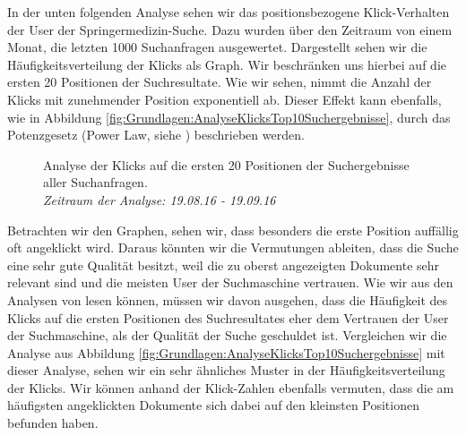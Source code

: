 
In der unten folgenden Analyse sehen wir das positionsbezogene Klick-Verhalten der User der Springermedizin-Suche. Dazu wurden über den Zeitraum von einem Monat, die letzten 1000 Suchanfragen ausgewertet. Dargestellt sehen wir die Häufigkeitsverteilung der Klicks als Graph. Wir beschränken uns hierbei auf die ersten 20 Positionen der Suchresultate. Wie wir sehen, nimmt die Anzahl der Klicks mit zunehmender Position exponentiell ab. Dieser Effekt kann ebenfalls, wie in Abbildung \ref{fig:Grundlagen:AnalyseKlicksTop10Suchergebnisse}, durch das Potenzgesetz (Power Law, siehe \cite{PowerLaw}) beschrieben werden. 

\begin{figure}[H]
\centering 
\vspace{-1em}
\caption[Analyse der Klicks auf die ersten 20 Positionen der Suchergebnisse aller Suchanfragen. \textit{Zeitraum der Analyse: 19.08.16 - 19.09.16}]{Analyse der Klicks auf die ersten 20 Positionen der Suchergebnisse aller Suchanfragen. \\ \textit{Zeitraum der Analyse: 19.08.16 - 19.09.16}}
\label{fig:Grundlage:AnalyseKlicksPositionen}

\topRanks
  

\vspace{-2em}
\end{figure}

Betrachten wir den Graphen, sehen wir, dass besonders die erste Position auffällig oft angeklickt wird. Daraus könnten wir die Vermutungen ableiten, dass die Suche eine sehr gute Qualität besitzt, weil die zu oberst angezeigten Dokumente sehr relevant sind und die meisten User der Suchmaschine vertrauen. Wie wir aus den Analysen von \cite{Joachims} lesen können, müssen wir davon ausgehen, dass die Häufigkeit des Klicks auf die ersten Positionen des Suchresultates eher dem Vertrauen der User der Suchmaschine, als der Qualität der Suche geschuldet ist. Vergleichen wir die Analyse aus Abbildung \ref{fig:Grundlagen:AnalyseKlicksTop10Suchergebnisse} mit dieser Analyse, sehen wir ein sehr ähnliches Muster in der Häufigkeitsverteilung der Klicks. Wir können anhand der Klick-Zahlen ebenfalls vermuten, dass die am häufigsten angeklickten Dokumente sich dabei auf den kleinsten Positionen befunden haben.